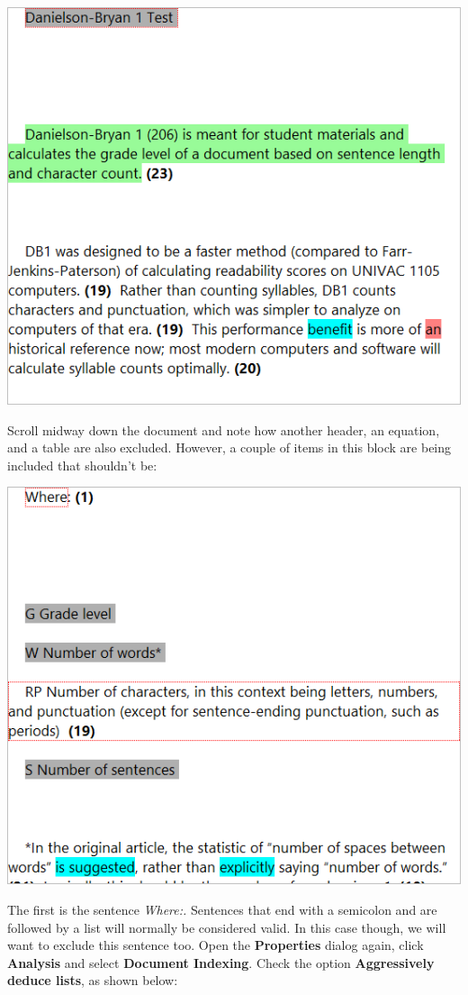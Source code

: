 \documentclass[
]{book}
\theoremstyle{definition}
\theoremstyle{definition}
\theoremstyle{definition}
\theoremstyle{definition}
\theoremstyle{remark}
\begin{document}
\includegraphics{Images/ExclusionExampleHeaderExcluded.png}

Scroll midway down the document and note how another header, an equation, and a table are also excluded. However, a couple of items in this block are being included that shouldn't be:

\includegraphics{Images/ExclusionExamplePartialExcluded.png}

The first is the sentence \emph{Where:.} Sentences that end with a semicolon and are followed by a list will normally be considered valid. In this case though, we will want to exclude this sentence too. Open the \textbf{Properties} dialog again, click \textbf{Analysis} and select \textbf{Document Indexing}. Check the option \textbf{Aggressively deduce lists}, as shown below:
\end{document}
